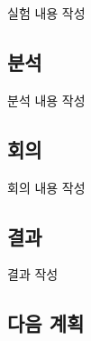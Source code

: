 \documentclass{research-note-v1.0}
\begin{document}
실험 내용 작성

\subsection*{분석}

분석 내용 작성

\subsection*{회의}

회의 내용 작성

\subsection*{결과}

결과 작성


\subsection*{다음 계획}
\end{document}
